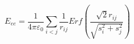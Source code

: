 \documentclass[12pt]{article}
\begin{document}
$$ 
E_{ee}  = \frac{1}{{4\pi \varepsilon _0 }}\sum\limits_{i < j} {\frac{1}{{r_{ij} }}Erf\left( {\frac{{\sqrt 2 r_{ij} }}{{\sqrt {s_i^2  + s_j^2 } }}} \right)} 
$$
\end{document}
